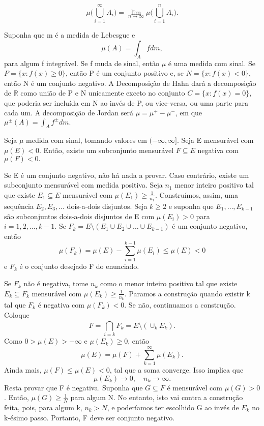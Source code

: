 \documentclass[MeasureTheory/measure_theory.tex]{subfiles}
\begin{document}
\[
	\mu \biggl(\bigcup_{i=1}^{\infty}A_{i}\biggr) = \lim_{n\to \infty}\mu \biggl(\bigcup_{i=1}^{n}A_{i}\biggr).
\]
\begin{example}
	Suponha que m é a medida de Lebesgue e
	\[
		\mu (A) = \int_{A}f dm,
	\]
	para algum f integrável. Se f muda de sinal, então \(\mu \) é uma medida com sinal.
	Se \(P = \{x: f(x)\geq 0  \}\), então P é um conjunto positivo e, se \(N = \{x:f(x)<0\},\) então N é um conjunto negativo. A Decomposição de Hahn dará a decomposição de \(\mathbb{R}\) como união de P e N unicamente exceto no conjunto \(C = \{x: f(x) = 0\},\) que
	poderia ser incluída em N ao invés de P, ou vice-versa, ou uma parte para cada um. A decomposição de Jordan será \(\mu  = \mu ^{+} - \mu ^{-}\), em que \(\mu ^{\pm}(A) = \int_{A}f^{\pm} dm.\)
\end{example}
\begin{prop*}
	Seja \(\mu \) medida com sinal, tomando valores em \((-\infty, \infty].\) Seja E mensurável com \(\mu(E) < 0\). Então, existe um subconjunto mensurável \(F\subseteq E\) negativa com \(\mu (F) < 0.\)
\end{prop*}
\begin{proof*}
	Se E é um conjunto negativo, não há nada a provar. Caso contrário, existe um subconjunto mensurável com medida positiva. Seja \(n_1\) menor inteiro positivo tal que existe \(E_1\subseteq E\) mensurável com
	\(\mu (E_1)\geq \frac{1}{n_1}\). Construímos, assim, uma sequência \(E_2, E_3, \dotsc \) dois-a-dois disjuntos. Seja \(k\geq 2\) e suponha que \(E_1, \dotsc , E_{k-1}\) são subconjuntos dois-a-dois disjuntos de E com
	\(\mu (E_{i}) > 0\) para \(i=1, 2, \dotsc , k-1\). Se \(F_{k}=E\setminus{(E_1\cup E_2\cup \dotsc \cup E_{k-1})}\) é um conjunto negativo, então
	\[
		\mu (F_{k}) = \mu (E) - \sum\limits_{i=1}^{k-1}\mu (E_{i}) \leq \mu (E) < 0
	\]
	e \(F_{k}\) é o conjunto desejado F do enunciado.

	Se \(F_{k}\) não é negativa, tome \(n_{k}\) como o menor inteiro positivo tal que existe \(E_{k}\subseteq F_{k}\) mensurável com \(\mu (E_{k})\geq \frac{1}{n_{k}}\).
	Paramos a construção quando existir k tal que \(F_{k}\) é negativa com \(\mu (F_{k}) < 0.\) Se não, continuamos a construção. Coloque
	\[
		F= \bigcap_{i=k}^{}F_{k} = E\setminus{(\cup _k E_{k})}.
	\]
	Como \(0 > \mu (E) > -\infty\) e \(\mu (E_{k})\geq 0\), então
	\[
		\mu (E) = \mu (F) + \sum\limits_{k=1}^{\infty}\mu (E_{k}).
	\]
	Ainda mais, \(\mu (F) \leq \mu (E) < 0\), tal que a soma converge. Isso implica que
	\[
		\mu (E_{k})\to 0,\quad n_{k}\to \infty.
	\]
	Resta provar que F é negativa. Suponha que \(G\subseteq F\) é mensurável com \(\mu (G) > 0\). Então, \(\mu (G) \geq \frac{1}{N}\) para algum N. No entanto, isto vai contra a construção feita, pois, para algum k, \(n_{k}> N\), e poderíamos ter escolhido
	G ao invés de \(E_{k}\) no k-ésimo passo. Portanto, F deve ser conjunto negativo. \qedsymbol
\end{proof*}
\end{document}
